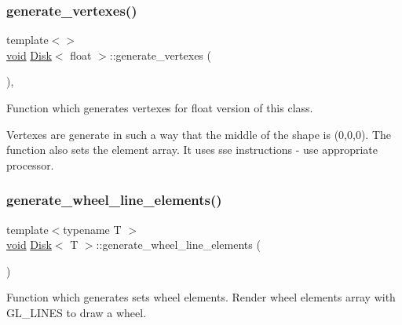 \mbox{\label{classDisk_a55648a13c42982087f60742da15c2c41}} 
\subsubsection{\texorpdfstring{generate\+\_\+vertexes()}{generate\_vertexes()}\hspace{0.1cm}{\footnotesize\ttfamily [2/2]}}
{\footnotesize\ttfamily template$<$$>$ \\
\mbox{\hyperlink{glad_8h_a950fc91edb4504f62f1c577bf4727c29}{void}} \mbox{\hyperlink{classDisk}{Disk}}$<$ float $>$\+::generate\+\_\+vertexes (\begin{DoxyParamCaption}{ }\end{DoxyParamCaption})\hspace{0.3cm}{\ttfamily [inline]}, {\ttfamily [private]}}



Function which generates vertexes for float version of this class. 

Vertexes are generate in such a way that the middle of the shape is (0,0,0). The function also sets the element array. It uses sse instructions -\/ use appropriate processor. \mbox{\label{classDisk_a4637847208b7236010085ca67f49e39a}} 
\subsubsection{\texorpdfstring{generate\+\_\+wheel\+\_\+line\+\_\+elements()}{generate\_wheel\_line\_elements()}}
{\footnotesize\ttfamily template$<$typename T $>$ \\
\mbox{\hyperlink{glad_8h_a950fc91edb4504f62f1c577bf4727c29}{void}} \mbox{\hyperlink{classDisk}{Disk}}$<$ T $>$\+::generate\+\_\+wheel\+\_\+line\+\_\+elements (\begin{DoxyParamCaption}{ }\end{DoxyParamCaption})\hspace{0.3cm}{\ttfamily [private]}}



Function which generates sets wheel elements. Render wheel elements array with G\+L\+\_\+\+L\+I\+N\+ES to draw a wheel. 

